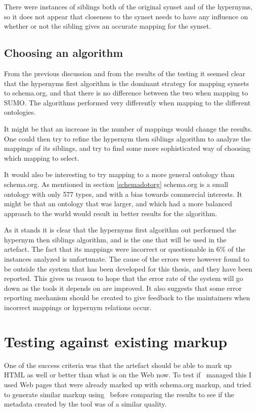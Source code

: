 There were instances of siblings both of the original synset and of the hypernyms,
so it does not appear that closeness to the synset needs to have any influence on whether or not the sibling gives
an accurate mapping for the synset.

\subsection{Choosing an algorithm}
From the previous discussion and from the results of the testing it seemed clear that the hypernyms first algorithm is
the dominant strategy for mapping synsets to schema.org, and that there is no difference between the two when mapping to SUMO.
The algorithms performed very differently when mapping to the different ontologies.

It might be that an increase in the number of mappings would change the results.
One could then try to refine the hypernym then siblings algorithm to analyze the mappings of its siblings,
and try to find some more sophisticated way of choosing which mapping to select.

It would also be interesting to try mapping to a more general ontology than schema.org.
As mentioned in section \ref{schemadotorg} schema.org is a small ontology with only 577 types,
and with a bias towards commercial interests.
It might be that an ontology that was larger,
and which had a more balanced approach to the world would result in better results for the algorithm.

As it stands it is clear that the hypernyms first algorithm out performed the hypernym then siblings algorithm,
and is the one that will be used in the artefact.
The fact that its mappings were incorrect or questionable in 6\% of the instances analyzed is unfortunate.
The cause of the errors were however found to be outside the system that has been developed for this thesis,
and they have been reported.
This gives us reason to hope that the error rate of the system will go down as the tools it depends on are improved.
It also suggests that some error reporting mechanism should be created to give feedback to the maintainers
when incorrect mappings or hypernym relations occur.


\section{Testing against existing markup}
One of the success criteria was that the artefact should be able to mark up HTML as well or better than what is on the Web now.
To test if \theartefact\ managed this I used Web pages that were already marked up with schema.org markup,
and tried to generate similar markup using \theartefact\ before comparing the results to see if the metadata created
by the tool was of a similar quality.

